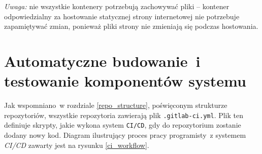 \textit{Uwaga:} nie wszystkie kontenery potrzebują zachowywać pliki -- kontener
odpowiedzialny za hostowanie statycznej strony internetowej nie potrzebuje
zapamiętywać zmian, ponieważ pliki strony nie zmieniają się podczas hostowania. 

\section{Automatyczne budowanie~i testowanie komponentów systemu}

Jak wspomniano~w rozdziale \ref{repo_structure}, poświęconym strukturze repozytoriów,
wszystkie repozytoria zawierają plik \texttt{.gitlab-ci.yml}. Plik ten definiuje skrypty,
jakie wykona system \texttt{CI/CD}, gdy do repozytorium zostanie dodany nowy kod.
Diagram ilustrujący proces pracy programisty~z systemem \textit{CI/CD} zawarty jest
na rysunku \ref{ci_workflow}.


